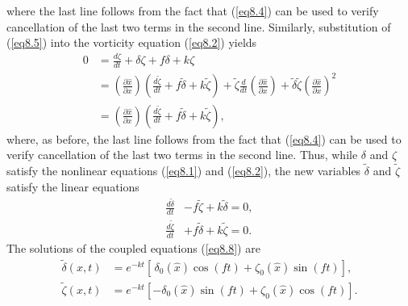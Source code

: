 \documentclass[10pt]{article}
\begin{document}
where the last line follows from the fact that (\ref{eq8.4}) can be used to verify
cancellation of the last two terms in the second line.
Similarly, substitution of (\ref{eq8.5}) into the vorticity equation (\ref{eq8.2})
yields
\begin{equation}                                    %
  \begin{split}
    0&= \frac{d\zeta}{dt} + \delta\zeta + f\delta + k\zeta      \\
     &= \left(\frac{\partial\hat{x}}{\partial x}\right)
        \left(\frac{d\tilde{\zeta}}{dt} + f\tilde{\delta} + k\tilde{\zeta}\right)
      + \tilde{\zeta} \frac{d}{dt}\left(\frac{\partial\hat{x}}{\partial x}\right)
      + \tilde{\delta}\tilde{\zeta}\left(\frac{\partial\hat{x}}{\partial x}\right)^2     \\
     &= \left(\frac{\partial\hat{x}}{\partial x}\right)
        \left(\frac{d\tilde{\zeta}}{dt} + f\tilde{\delta} + k\tilde{\zeta}\right),
  \end{split}
\label{eq8.7}
\end{equation}
where, as before, the last line follows from the fact that (\ref{eq8.4}) can be used
to verify cancellation of the last two terms in the second line.
Thus, while $\delta$ and $\zeta$ satisfy the nonlinear equations (\ref{eq8.1})
and (\ref{eq8.2}), the new variables $\tilde{\delta}$ and $\tilde{\zeta}$
satisfy the linear equations
\begin{equation}                                    %
  \begin{split}
       \frac{d\tilde{\delta}}{dt} &- f\tilde{\zeta}  + k\tilde{\delta} = 0,    \\
       \frac{d\tilde{\zeta} }{dt} &+ f\tilde{\delta} + k\tilde{\zeta}  = 0.
  \end{split}
\label{eq8.8}
\end{equation}
The solutions of the coupled equations (\ref{eq8.8}) are
\begin{equation}                                    %
  \begin{split}
     \tilde{\delta}(x,t) &= e^{-kt}\left[\,\delta_0(\hat{x})\cos(ft)
                                         + \zeta_0 (\hat{x})\sin(ft)\right],  \\
     \tilde{\zeta} (x,t) &= e^{-kt}\left[- \delta_0(\hat{x})\sin(ft)
                                         + \zeta_0 (\hat{x})\cos(ft)\right].
  \end{split}
\label{eq8.9}
\end{equation}
\end{document}
